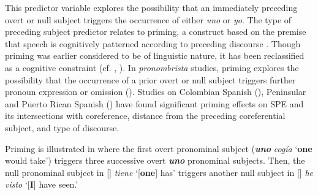 \documentclass[output=paper]{langscibook}
\begin{document}
\label{sec:orozco:3.3.1.2}


This predictor variable explores the possibility that an immediately preceding overt or null subject triggers the occurrence of either \textit{uno} or \textit{yo}. The type of preceding subject predictor relates to priming, a construct based on the premise that speech is cognitively patterned according to preceding discourse \citep{Travis2007}. Though priming was earlier considered to be of linguistic nature, it has been reclassified as a cognitive constraint (cf. \citealt{Labov2010}, \citealt{TammingaEmbick2016}). In \textit{pronombrista} studies, priming explores the possibility that the occurrence of a prior overt or null subject triggers further pronoun expression or omission (\citealt{CameronFlores-Ferrán2004}). Studies on Colombian Spanish (\citealt{TorresCacoullosTravis2019, Travis2005, Travis2007}), Peninsular and Puerto Rican Spanish (\citealt{Cameron1994, Flores-Ferrán2002}) have found significant priming effects on SPE and its intersections with coreference, distance from the preceding coreferential subject, and type of discourse. 



Priming is illustrated in  where the first overt pronominal subject (\textbf{\textit{uno}} \textit{cogía} ‘\textbf{one} would take’) triggers three successive overt \textbf{\textit{uno}} pronominal subjects. Then, the null pronominal subject in [] \textit{tiene} ‘[\textbf{one}] has’ triggers another null subject in [] \textit{he visto} ‘[\textbf{I}] have seen.’  
\end{document}
